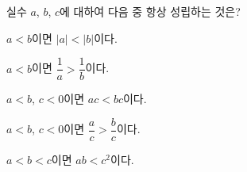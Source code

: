 실수 $a$, $b$, $c$에 대하여 다음 중 항상 성립하는 것은?
\begin{choicesv}{\rule[-3ex]{0pt}{8ex}$a<b$이면 $|a|<|b|$이다.}{\rule[-3ex]{0pt}{8ex}$a<b$이면 $\dfrac{1}{a}>\dfrac{1}{b}$이다.}{\rule[-3ex]{0pt}{8ex}$a<b$, $c<0$이면 $ac<bc$이다.}{\rule[-3ex]{0pt}{8ex}$a<b$, $c<0$이면 $\dfrac{a}{c}>\dfrac{b}{c}$이다.}{\rule[-3ex]{0pt}{8ex}$a<b<c$이면 $ab<c^2$이다.}\end{choicesv}
